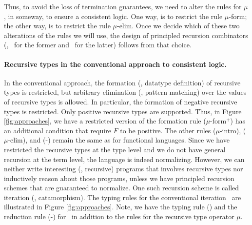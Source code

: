 Thus, to avoid the loss of termination guarantees, we need to alter the rules
for $\mu$, in someway, to ensure a consistent logic. One way, is to restrict
the rule {\small $\mu$-form}; the other way, is to restrict the rule
{\small $\mu$-elim}. Once we decide which of these two alterations of the
rules we will use, the design of principled recursion combinators (\eg, \It\
for the former and \MIt\ for the latter) follows from that choice.

\paragraph{Recursive types in the conventional approach to consistent logic.}
In the conventional approach, the formation (\ie, datatype definition) of
recursive types is restricted, but arbitrary elimination (\ie, pattern matching)
over the values of recursive types is allowed. In particular, the formation of
negative recursive types is restricted. Only positive recursive types are
supported. Thus, in Figure \ref{fig:approaches}, we have a restricted version of
the formation rule {\small($\mu$-form$^{+}$)} has an additional condition that
require $F$ to be positive. The other rules {\small($\mu$-intro)},
{\small($\mu$-elim)}, and {\small(\unIn-\In)} remain the same as for
functional languages. Since we have restricted the recursive types
at the type level and we do not have general recursion at the term level,
the language is indeed normalizing. However, we can neither write
interesting (\ie, recursive) programs that involves recursive types nor
inductively reason about those programs, unless we have principled recursion
schemes that are guaranteed to normalize. One such recursion scheme is called
iteration (\aka, catamorphism). The typing rules for the conventional iteration
\It\ are illustrated in Figure \ref{fig:approaches}. Note, we have the typing
rule {\small(\It)} and the reduction rule {\small(\It-\In)} for \It\,
in addition to the rules for the recursive type operator $\mu$.

